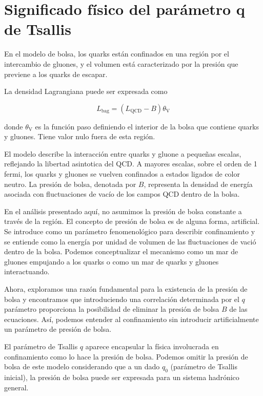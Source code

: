 \chapter{Significado físico del parámetro q de Tsallis}\label{ch-PhysicalMeaningQ}


En el modelo de bolsa, los quarks están confinados en una región por el intercambio de gluones, y el volumen está caracterizado por la presión que previene a los quarks de escapar.

La densidad Lagrangiana puede ser expresada como

\begin{equation}
{L}_{\mathrm{bag}} = \left({L}_{\mathrm{QCD}} - B\right){\theta}_{\mathrm{V}}
\end{equation}

donde ${\theta}_{\mathrm{V}}$ es la función paso definiendo el interior de la bolsa que contiene quarks y gluones. Tiene valor nulo fuera de esta región.

El modelo describe la interacción entre quarks y gluone a pequeñas escalas, reflejando la libertad asintotica del QCD. A mayores escalas, sobre el orden de 1 fermi, los quarks y gluones se vuelven confinados a estados ligados de color neutro. La presión de bolsa, denotada por $B$, representa la densidad de energía asociada con fluctuaciones de vacío de los campos QCD dentro de la bolsa.

En el análisis presentado aquí, no asumimos la presión de bolsa constante a través de la región. El concepto de presión de bolsa es de alguna forma, artificial. Se introduce como un parámetro fenomenológico para describir confinamiento y se entiende como la energía por unidad de volumen de las fluctuaciones de vació dentro de la bolsa. Podemos conceptualizar el mecanismo como un mar de gluones empujando a los quarks o como un mar de quarks y gluones interactuando.

Ahora, exploramos una razón fundamental para la existencia de la presión de bolsa y encontramos que introduciendo una correlación determinada por el $q$ parámetro proporciona la posibilidad de eliminar la presión de bolsa $B$ de las ecuaciones. Así, podemos entender al confinamiento sin introducir artificialmente un parámetro de presión de bolsa.

El parámetro de Tsallis $q$ aparece encapsular la física involucrada en confinamiento como lo hace la presión de bolsa. Podemos omitir la presión de bolsa de este modelo considerando que a un dado ${q}_{0}$ (parámetro de Tsallis inicial), la presión de bolsa puede ser expresada para un sistema hadrónico general.

